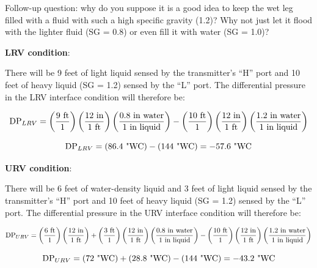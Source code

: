 \vskip 10pt

Follow-up question: why do you suppose it is a good idea to keep the wet leg filled with a fluid with such a high specific gravity (1.2)?  Why not just let it flood with the lighter fluid (SG = 0.8) or even fill it with water (SG = 1.0)?







\noindent
{\bf LRV condition}:

There will be 9 feet of light liquid sensed by the transmitter's ``H'' port and 10 feet of heavy liquid (SG = 1.2) sensed by the ``L'' port.  The differential pressure in the LRV interface condition will therefore be:

$$\hbox{DP}_{LRV} = \left(9 \hbox{ ft} \over 1 \right) \left(12 \hbox{ in} \over 1 \hbox{ ft}\right) \left(0.8 \hbox{ in water} \over 1 \hbox{ in liquid} \right) - \left(10 \hbox{ ft} \over 1 \right) \left(12 \hbox{ in} \over 1 \hbox{ ft}\right) \left(1.2 \hbox{ in water} \over 1 \hbox{ in liquid} \right) $$

$$\hbox{DP}_{LRV} = (86.4 \hbox{ "WC}) - (144 \hbox{ "WC}) = -57.6 \hbox{ "WC}$$

\vskip 10pt

\noindent
{\bf URV condition}:

There will be 6 feet of water-density liquid and 3 feet of light liquid sensed by the transmitter's ``H'' port and 10 feet of heavy liquid (SG = 1.2) sensed by the ``L'' port.  The differential pressure in the URV interface condition will therefore be:

$$\hbox{DP}_{URV} = \left(6 \hbox{ ft} \over 1 \right) \left(12 \hbox{ in} \over 1 \hbox{ ft}\right) + \left(3 \hbox{ ft} \over 1 \right) \left(12 \hbox{ in} \over 1 \hbox{ ft}\right) \left(0.8 \hbox{ in water} \over 1 \hbox{ in liquid} \right) - \left(10 \hbox{ ft} \over 1 \right) \left(12 \hbox{ in} \over 1 \hbox{ ft}\right) \left(1.2 \hbox{ in water} \over 1 \hbox{ in liquid} \right) $$

$$\hbox{DP}_{URV} = (72 \hbox{ "WC}) + (28.8 \hbox{ "WC}) - (144 \hbox{ "WC}) = -43.2 \hbox{ "WC}$$



